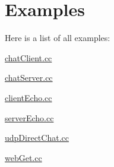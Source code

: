 \section{Examples}
Here is a list of all examples\+:\begin{DoxyCompactItemize}
\item 
\hyperlink{chatClient_8cc-example}{chat\+Client.\+cc}
\item 
\hyperlink{chatServer_8cc-example}{chat\+Server.\+cc}
\item 
\hyperlink{clientEcho_8cc-example}{client\+Echo.\+cc}
\item 
\hyperlink{serverEcho_8cc-example}{server\+Echo.\+cc}
\item 
\hyperlink{udpDirectChat_8cc-example}{udp\+Direct\+Chat.\+cc}
\item 
\hyperlink{webGet_8cc-example}{web\+Get.\+cc}
\end{DoxyCompactItemize}

